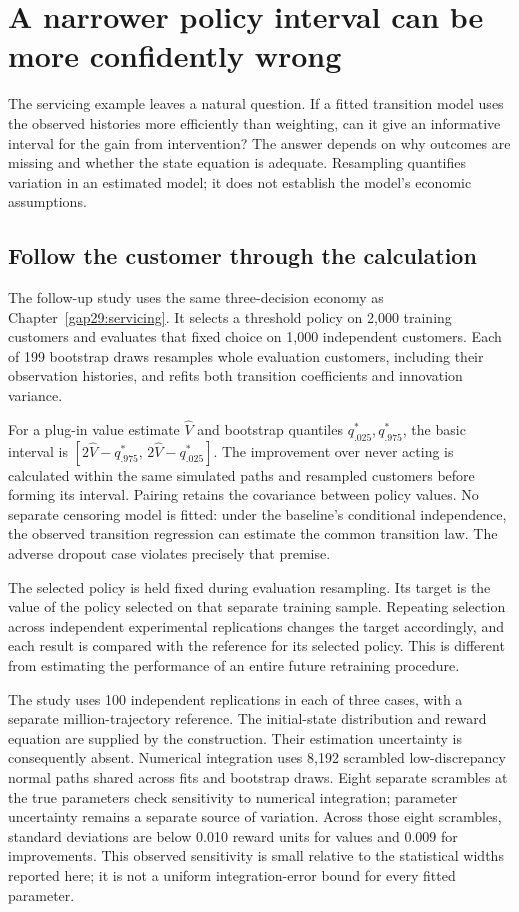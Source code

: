 \chapter{A narrower policy interval can be more confidently wrong}
\label{gap29:policy-uncertainty}
The servicing example leaves a natural question. If a fitted transition
model uses the observed histories more efficiently than weighting, can it
give an informative interval for the gain from intervention? The answer
depends on why outcomes are missing and whether the state equation is
adequate. Resampling quantifies variation in an estimated model; it does
not establish the model's economic assumptions.

\section{Follow the customer through the calculation}
The follow-up study uses the same three-decision economy as
Chapter~\ref{gap29:servicing}. It selects a threshold policy on 2,000
training customers and evaluates that fixed choice on 1,000 independent
customers. Each of 199 bootstrap draws resamples whole evaluation
customers, including their observation histories, and refits both
transition coefficients and innovation variance.

For a plug-in value estimate $\widehat V$ and bootstrap quantiles
$q^*_{.025},q^*_{.975}$, the basic interval is
$[2\widehat V-q^*_{.975},\,2\widehat V-q^*_{.025}]$.
The improvement over never acting is calculated within the same simulated
paths and resampled customers before forming its interval. Pairing retains
the covariance between policy values. No separate censoring model is fitted:
under the baseline's conditional independence, the observed transition
regression can estimate the common transition law. The adverse dropout case
violates precisely that premise.

The selected policy is held fixed during evaluation resampling. Its target
is the value of the policy selected on that separate training sample.
Repeating selection across independent experimental replications changes
the target accordingly, and each result is compared with the reference for
its selected policy. This is different from estimating the performance of
an entire future retraining procedure.

The study uses 100 independent replications in each of three cases, with a
separate million-trajectory reference. The initial-state distribution and
reward equation are supplied by the construction. Their estimation
uncertainty is consequently absent. Numerical integration uses 8,192
scrambled low-discrepancy normal paths shared across fits and bootstrap
draws. Eight separate scrambles at the true parameters check sensitivity
to numerical integration; parameter uncertainty remains a separate source
of variation. Across those eight scrambles, standard deviations are below
0.010 reward units for values and 0.009 for improvements. This observed
sensitivity is small relative to the statistical widths reported here; it
is not a uniform integration-error bound for every fitted parameter.

